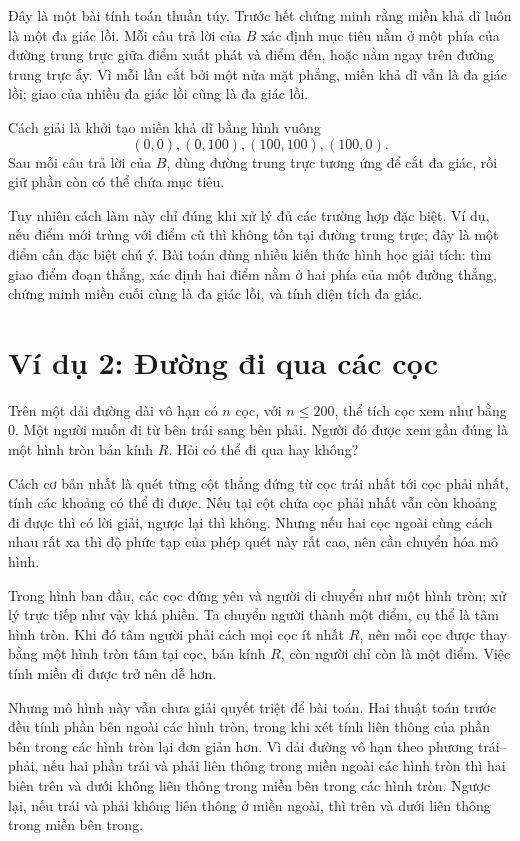 \documentclass[11pt]{article}
\begin{document}
Đây là một bài tính toán thuần túy. Trước hết chứng minh rằng miền khả dĩ luôn
là một đa giác lồi. Mỗi câu trả lời của \(B\) xác định mục tiêu nằm ở một phía
của đường trung trực giữa điểm xuất phát và điểm đến, hoặc nằm ngay trên đường
trung trực ấy. Vì mỗi lần cắt bởi một nửa mặt phẳng, miền khả dĩ vẫn là đa
giác lồi; giao của nhiều đa giác lồi cũng là đa giác lồi.

Cách giải là khởi tạo miền khả dĩ bằng hình vuông
\[
  (0,0),(0,100),(100,100),(100,0).
\]
Sau mỗi câu trả lời của \(B\), dùng đường trung trực tương ứng để cắt đa giác,
rồi giữ phần còn có thể chứa mục tiêu.

Tuy nhiên cách làm này chỉ đúng khi xử lý đủ các trường hợp đặc biệt. Ví dụ,
nếu điểm mới trùng với điểm cũ thì không tồn tại đường trung trực; đây là một
điểm cần đặc biệt chú ý. Bài toán dùng nhiều kiến thức hình học giải tích:
tìm giao điểm đoạn thẳng, xác định hai điểm nằm ở hai phía của một đường
thẳng, chứng minh miền cuối cùng là đa giác lồi, và tính diện tích đa giác.

\section{Ví dụ 2: Đường đi qua các cọc}

Trên một dải đường dài vô hạn có \(n\) cọc, với \(n\le200\), thể tích cọc xem
như bằng \(0\). Một người muốn đi từ bên trái sang bên phải. Người đó được
xem gần đúng là một hình tròn bán kính \(R\). Hỏi có thể đi qua hay không?

Cách cơ bản nhất là quét từng cột thẳng đứng từ cọc trái nhất tới cọc phải
nhất, tính các khoảng có thể đi được. Nếu tại cột chứa cọc phải nhất vẫn còn
khoảng đi được thì có lời giải, ngược lại thì không. Nhưng nếu hai cọc ngoài
cùng cách nhau rất xa thì độ phức tạp của phép quét này rất cao, nên cần
chuyển hóa mô hình.

Trong hình ban đầu, các cọc đứng yên và người di chuyển như một hình tròn; xử
lý trực tiếp như vậy khá phiền. Ta chuyển người thành một điểm, cụ thể là tâm
hình tròn. Khi đó tâm người phải cách mọi cọc ít nhất \(R\), nên mỗi cọc được
thay bằng một hình tròn tâm tại cọc, bán kính \(R\), còn người chỉ còn là một
điểm. Việc tính miền đi được trở nên dễ hơn.

Nhưng mô hình này vẫn chưa giải quyết triệt để bài toán. Hai thuật toán trước
đều tính phần bên ngoài các hình tròn, trong khi xét tính liên thông của phần
bên trong các hình tròn lại đơn giản hơn. Vì dải đường vô hạn theo phương
trái--phải, nếu hai phần trái và phải liên thông trong miền ngoài các hình
tròn thì hai biên trên và dưới không liên thông trong miền bên trong các hình
tròn. Ngược lại, nếu trái và phải không liên thông ở miền ngoài, thì trên và
dưới liên thông trong miền bên trong.
\end{document}
